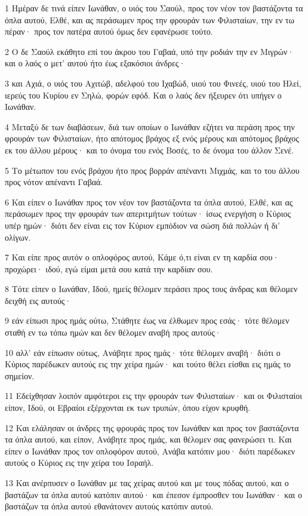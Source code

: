 \par 1 Ημέραν δε τινά είπεν Ιωνάθαν, ο υιός του Σαούλ, προς τον νέον τον βαστάζοντα τα όπλα αυτού, Ελθέ, και ας περάσωμεν προς την φρουράν των Φιλισταίων, την εν τω πέραν· προς τον πατέρα αυτού όμως δεν εφανέρωσε τούτο.
\par 2 Ο δε Σαούλ εκάθητο επί του άκρου του Γαβαά, υπό την ροδιάν την εν Μιγρών· και ο λαός ο μετ' αυτού ήτο έως εξακόσιοι άνδρες·
\par 3 και Αχιά, ο υιός του Αχιτώβ, αδελφού του Ιχαβώδ, υιού του Φινεές, υιού του Ηλεί, ιερεύς του Κυρίου εν Σηλώ, φορών εφόδ. Και ο λαός δεν ήξευρεν ότι υπήγεν ο Ιωνάθαν.
\par 4 Μεταξύ δε των διαβάσεων, διά των οποίων ο Ιωνάθαν εζήτει να περάση προς την φρουράν των Φιλισταίων, ήτο απότομος βράχος εξ ενός μέρους και απότομος βράχος εκ του άλλου μέρους· και το όνομα του ενός Βοσές, το δε όνομα του άλλον Σενέ.
\par 5 Το μέτωπον του ενός βράχου ήτο προς βορράν απέναντι Μιχμάς, και το του άλλου προς νότον απέναντι Γαβαά.
\par 6 Και είπεν ο Ιωνάθαν προς τον νέον τον βαστάζοντα τα όπλα αυτού, Ελθέ, και ας περάσωμεν προς την φρουράν των απεριτμήτων τούτων· ίσως ενεργήση ο Κύριος υπέρ ημών· διότι δεν είναι εις τον Κύριον εμπόδιον να σώση διά πολλών ή δι' ολίγων.
\par 7 Και είπε προς αυτόν ο οπλοφόρος αυτού, Κάμε ό,τι είναι εν τη καρδία σου· προχώρει· ιδού, εγώ είμαι μετά σου κατά την καρδίαν σου.
\par 8 Τότε είπεν ο Ιωνάθαν, Ιδού, ημείς θέλομεν περάσει προς τους άνδρας και θέλομεν δειχθή εις αυτούς·
\par 9 εάν είπωσι προς ημάς ούτω, Στάθητε έως να έλθωμεν προς εσάς· τότε θέλομεν σταθή εν τω τόπω ημών και δεν θέλομεν αναβή προς αυτούς·
\par 10 αλλ' εάν είπωσιν ούτως, Ανάβητε προς ημάς· τότε θέλομεν αναβή· διότι ο Κύριος παρέδωκεν αυτούς εις την χείρα ημών· και τούτο θέλει είσθαι εις ημάς το σημείον.
\par 11 Εδείχθησαν λοιπόν αμφότεροι εις την φρουράν των Φιλισταίων· και οι Φιλισταίοι είπον, Ιδού, οι Εβραίοι εξέρχονται εκ των τρυπών, όπου είχον κρυφθή.
\par 12 Και ελάλησαν οι άνδρες της φρουράς προς τον Ιωνάθαν και προς τον βαστάζοντα τα όπλα αυτού, και είπον, Ανάβητε προς ημάς, και θέλομεν σας φανερώσει τι. Και είπεν ο Ιωνάθαν προς τον οπλοφόρον αυτού, Ανάβα κατόπιν μου· διότι παρέδωκεν αυτούς ο Κύριος εις την χείρα του Ισραήλ.
\par 13 Και ανέρπυσεν ο Ιωνάθαν με τας χείρας αυτού και με τους πόδας αυτού, και ο βαστάζων τα όπλα αυτού κατόπιν αυτού· και έπεσον έμπροσθεν του Ιωνάθαν· και ο βαστάζων τα όπλα αυτού εθανάτονεν αυτούς κατόπιν αυτού.

